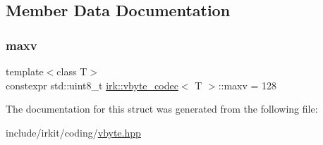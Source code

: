 \subsection{Member Data Documentation}
\mbox{\label{structirk_1_1vbyte__codec_ae5d8ab43b690ec1925bf1e59593fd66f}} 
\subsubsection{\texorpdfstring{maxv}{maxv}}
{\footnotesize\ttfamily template$<$class T$>$ \\
constexpr std\+::uint8\+\_\+t \mbox{\hyperlink{structirk_1_1vbyte__codec}{irk\+::vbyte\+\_\+codec}}$<$ T $>$\+::maxv = 128\hspace{0.3cm}{\ttfamily [static]}}



The documentation for this struct was generated from the following file\+:\begin{DoxyCompactItemize}
\item 
include/irkit/coding/\mbox{\hyperlink{vbyte_8hpp}{vbyte.\+hpp}}\end{DoxyCompactItemize}
